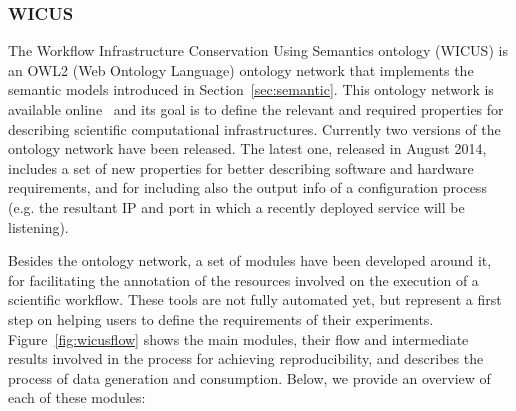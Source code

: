 \subsubsection{WICUS}


The Workflow Infrastructure Conservation Using Semantics ontology 
(WICUS) is an OWL2 (Web Ontology Language) ontology network that 
implements the semantic models introduced in Section~\ref{sec:semantic}. This ontology 
network is available online~\cite{wicus-online} and its goal is to define the relevant and 
required properties for describing scientific computational infrastructures. 
Currently two versions of the ontology network have been released. The latest one, released in
August 2014,  includes a set of new properties for better describing software and hardware requirements, and for
including also the output info of a configuration process (e.g. the resultant IP and port in 
which a recently deployed service will be listening).


Besides the ontology network, a set of modules have been developed around it, 
for facilitating the annotation of the resources involved on the execution of a scientific workflow. 
These tools are not fully automated yet, but represent a first step on helping users to define the requirements of their 
experiments. Figure~\ref{fig:wicusflow} shows the main modules, their flow and intermediate 
results involved in the process for achieving reproducibility, and describes the process of 
data generation and consumption. Below, we provide an overview of each of these modules:

